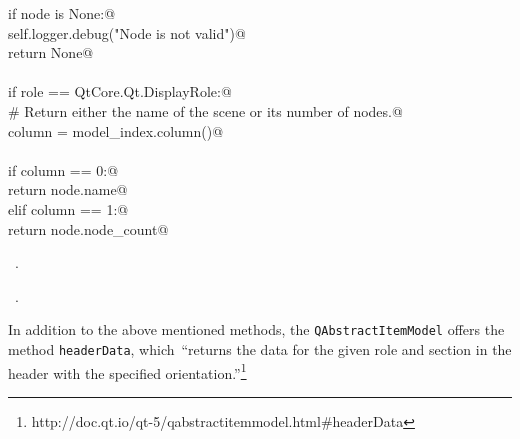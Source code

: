 \documentclass[
    a4paper,      %
    10pt,         %
    openright,    %
    notitlepage,  %
    parskip=half, %
]{scrreprt}       %
\theoremstyle{definition}                    %
\begin{document}
\begin{flushleft}
\begin{minipage}{\linewidth}
\begin{list}{}{}
\mbox{}\lstinline@    if node is None:@\\
\mbox{}\lstinline@        self.logger.debug("Node is not valid")@\\
\mbox{}\lstinline@        return None@\\
\mbox{}\lstinline@@\\
\mbox{}\lstinline@    if role == QtCore.Qt.DisplayRole:@\\
\mbox{}\lstinline@        # Return either the name of the scene or its number of nodes.@\\
\mbox{}\lstinline@        column = model_index.column()@\\
\mbox{}\lstinline@@\\
\mbox{}\lstinline@        if column == 0:@\\
\mbox{}\lstinline@            return node.name@\\
\mbox{}\lstinline@        elif column == 1:@\\
\mbox{}\lstinline@            return node.node_count@\\
\mbox{}\lstinline@@{\NWsep}
\end{list}
\vspace{-1.5ex}
\footnotesize
\begin{list}{}{\setlength{\itemsep}{-\parsep}\setlength{\itemindent}{-\leftmargin}}
\item \NWtxtMacroDefBy\ .
\item \NWtxtMacroRefIn\ .

\item{}
\end{list}
\end{minipage}\vspace{4ex}
\end{flushleft}
In addition to the above mentioned methods, the \verb+QAbstractItemModel+ offers
the method \verb+headerData+, which~\enquote{returns the data for the given role
and section in the header with the specified orientation.}\footnote{http://doc.qt.io/qt-5/qabstractitemmodel.html\#headerData}
\end{document}
